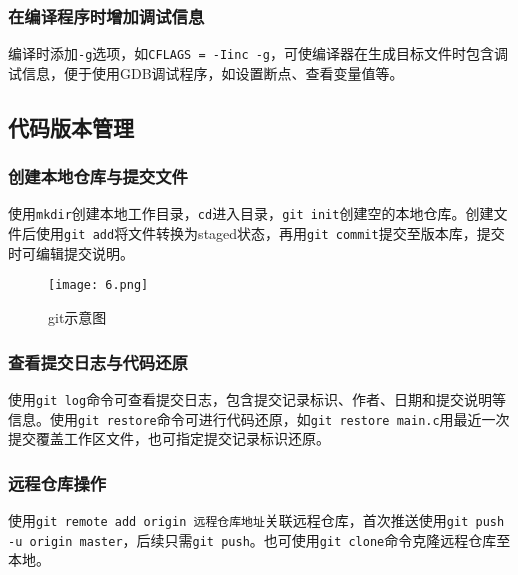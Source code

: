 \subsubsection{在编译程序时增加调试信息}
编译时添加\texttt{-g}选项，如\texttt{CFLAGS = -Iinc -g}，可使编译器在生成目标文件时包含调试信息，便于使用GDB调试程序，如设置断点、查看变量值等。


\subsection{代码版本管理}
\subsubsection{创建本地仓库与提交文件}
使用\texttt{mkdir}创建本地工作目录，\texttt{cd}进入目录，\texttt{git init}创建空的本地仓库。创建文件后使用\texttt{git add}将文件转换为staged状态，再用\texttt{git commit}提交至版本库，提交时可编辑提交说明。
\begin{figure}[H]
    \centering
    \captionsetup{skip=4pt}
    \texttt{[image: 6.png]}
    \caption{git示意图} 
\end{figure}

\subsubsection{查看提交日志与代码还原}
使用\texttt{git log}命令可查看提交日志，包含提交记录标识、作者、日期和提交说明等信息。使用\texttt{git restore}命令可进行代码还原，如\texttt{git restore main.c}用最近一次提交覆盖工作区文件，也可指定提交记录标识还原。

\subsubsection{远程仓库操作}
使用\texttt{git remote add origin 远程仓库地址}关联远程仓库，首次推送使用\texttt{git push -u origin master}，后续只需\texttt{git push}。也可使用\texttt{git clone}命令克隆远程仓库至本地。

